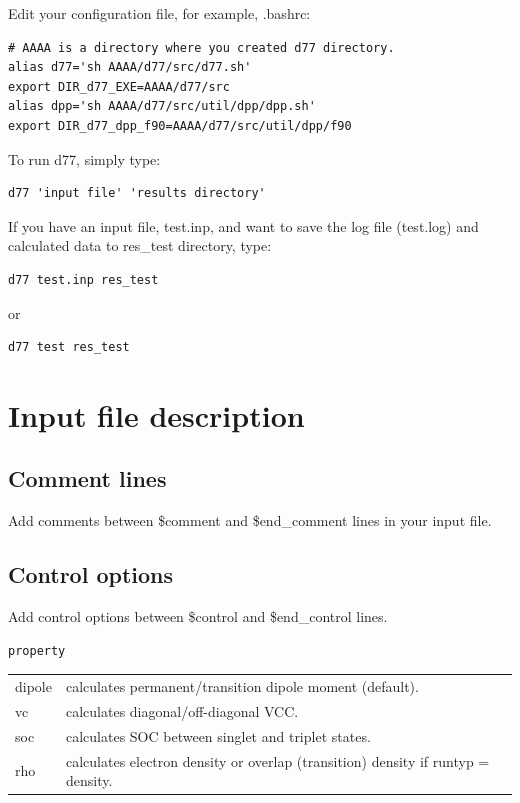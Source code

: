﻿\documentclass[11pt,a4paper,openany]{article}
\begin{document}
\clearpage
Edit your configuration file, for example, .bashrc:
\begin{verbatim} 
# AAAA is a directory where you created d77 directory.
alias d77='sh AAAA/d77/src/d77.sh'
export DIR_d77_EXE=AAAA/d77/src
alias dpp='sh AAAA/d77/src/util/dpp/dpp.sh'
export DIR_d77_dpp_f90=AAAA/d77/src/util/dpp/f90
\end{verbatim} 
To run d77, simply type:
\begin{verbatim} 
d77 'input file' 'results directory'
\end{verbatim}
If you have an input file, test.inp, and want to save the log file (test.log) and calculated data to res\_test directory, type:
\begin{verbatim} 
d77 test.inp res_test
\end{verbatim}
or 
\begin{verbatim} 
d77 test res_test
\end{verbatim}

\clearpage
\section{Input file description}

\subsection{Comment lines}
\noindent
Add comments between \$comment and \$end\_comment lines in your input file.

\subsection{Control options}
\noindent
Add control options between \$control and \$end\_control lines.

\begin{verbatim}
property
\end{verbatim}
\begin{tabular}{ll}
dipole & calculates permanent/transition dipole moment (default).\\
vc & calculates diagonal/off-diagonal VCC. \\
soc & calculates SOC between singlet and triplet states.\\
rho & calculates electron density or overlap (transition) density if runtyp = density.
\end{tabular}
\\
\end{document}
